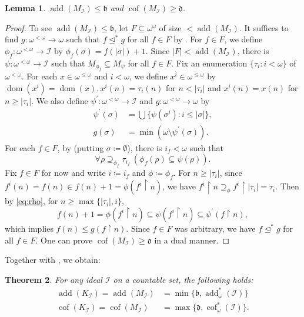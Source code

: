 \documentclass[a4paper,12pt]{amsart}
\newtheorem{thm}{Theorem}
\newtheorem{lem}[thm]{Lemma}
\theoremstyle{definition}
\numberwithin{thm}{section}
\numberwithin{equation}{section}
\newcommand{\oo}{{\omega}^\omega}
\newcommand{\on}{\mathpunct{\upharpoonright}}
\newcommand{\bb}{\mathfrak{b}}
\newcommand{\dd}{\mathfrak{d}}
\DeclareMathOperator{\add}{add}
\DeclareMathOperator{\cof}{cof}
\DeclareMathOperator{\dom}{dom}
\newcommand{\I}{\mathscr{I}}
\newcommand{\sbd}{\trianglelefteq^*}
\renewcommand{\subset}{\subseteq}
\begin{document}
    \begin{lem}\label{lem:addM_I_leq_b}
        $\add(M_\I)\leq\bb$ and $\cof(M_\I)\geq\dd$.
    \end{lem}
    \begin{proof}
        To see $\add(M_\I)\leq\bb$, let $F\subseteq\oo$ of size $<\add(M_\I)$. It suffices to find $g\colon\omega^{<\omega}\to\omega$ such that $f\sbd g$ for all $f\in F$ by . For $f\in F$, we define $\phi_f\colon\omega^{<\omega}\to\I$ by $\phi_f(\sigma) =  f(\lvert\sigma\rvert)+1$. Since $\lvert F\rvert<\add(M_\I)$, there is $\psi\colon\omega^{<\omega}\to\I$ such that $M_{\phi_f}\subset M_\psi$ for all $f\in F$. Fix an enumeration $\{\tau_i:i<\omega\}$ of $\omega^{<\omega}$.
        For each $x\in\omega^{\leq\omega}$ and $i<\omega$, we define $x^i\in\omega^{\leq\omega}$ by $\dom(x^i)=\dom(x), x^i(n) = \tau_i(n)$ for $n<\lvert\tau_i\rvert$ and $x^i(n) = x(n)$ for $n\geq\lvert\tau_i\rvert$. We also define $\psi^\prime\colon\omega^{<\omega}\to\I$ and $g\colon\omega^{<\omega}\to\omega$ by
        \begin{align*}
            \psi^\prime(\sigma) &=\bigcup\{\psi(\sigma^i):i\leq|\sigma|\},\\
            g(\sigma) &= \min(\omega\setminus\psi^\prime(\sigma)).
        \end{align*}
        For each $f\in F$, by  (putting $\sigma\coloneqq\emptyset$), there is $i_f<\omega$ such that
        \begin{equation}\label{eq:rho}
            \forall\rho\supseteq_{\phi_f}\tau_{i_f}~(\phi_f(\rho)\subseteq\psi(\rho)). 
        \end{equation}
        Fix $f\in F$ for now and write $i\coloneqq i_f$ and $\phi\coloneqq\phi_f$. For $n\geq\rvert\tau_{i}\lvert$,  since $f^i(n)=f(n)\in f(n)+1 = \phi(f^i\on n)$, we have $f^i\on n\supseteq_{\phi}f^i\on\lvert\tau_i\rvert =\tau_{i}$. Then by \eqref{eq:rho}, for $n\geq\max\{\lvert\tau_{i}\rvert,i\}$,
        \[
        f(n)+1=\phi(f^i \on n)\subseteq\psi(f^i\on n)\subseteq\psi^\prime(f\on n),
        \]
        which implies $f(n)\leq g(f\on n)$. Since $f\in F$ was arbitrary, we have $f\sbd g$ for all $f\in F$. One can prove $\cof(M_\I)\geq\dd$ in a dual manner.
    \end{proof}

    Together with , we obtain:
    
    \begin{thm}\label{thm:exact_values_of_add}
        For any ideal $\I$ on a countable set, the following holds:
        \begin{align*}
            \add(K_\I) = \add(M_\I) &= \min\{\bb, \add^*_\omega(\I)\}\\ 
            \cof(K_\I) = \cof(M_\I) &= \max\{\dd, \cof^*_\omega(\I)\}.
        \end{align*}
    \end{thm}
\end{document}
